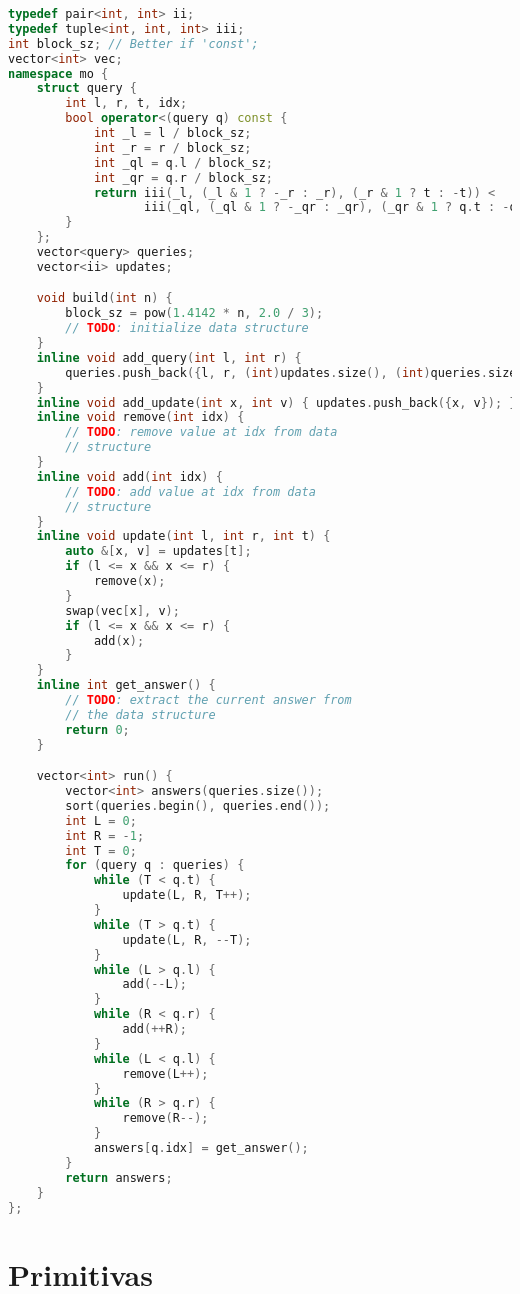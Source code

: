 \documentclass[10pt, a4paper, oneside]{book}
\begin{document}
\begin{lstlisting}[language=C++]
typedef pair<int, int> ii;
typedef tuple<int, int, int> iii;
int block_sz; // Better if 'const';
vector<int> vec;
namespace mo {
    struct query {
        int l, r, t, idx;
        bool operator<(query q) const {
            int _l = l / block_sz;
            int _r = r / block_sz;
            int _ql = q.l / block_sz;
            int _qr = q.r / block_sz;
            return iii(_l, (_l & 1 ? -_r : _r), (_r & 1 ? t : -t)) <
                   iii(_ql, (_ql & 1 ? -_qr : _qr), (_qr & 1 ? q.t : -q.t));
        }
    };
    vector<query> queries;
    vector<ii> updates;

    void build(int n) {
        block_sz = pow(1.4142 * n, 2.0 / 3);
        // TODO: initialize data structure
    }
    inline void add_query(int l, int r) {
        queries.push_back({l, r, (int)updates.size(), (int)queries.size()});
    }
    inline void add_update(int x, int v) { updates.push_back({x, v}); }
    inline void remove(int idx) {
        // TODO: remove value at idx from data
        // structure
    }
    inline void add(int idx) {
        // TODO: add value at idx from data
        // structure
    }
    inline void update(int l, int r, int t) {
        auto &[x, v] = updates[t];
        if (l <= x && x <= r) {
            remove(x);
        }
        swap(vec[x], v);
        if (l <= x && x <= r) {
            add(x);
        }
    }
    inline int get_answer() {
        // TODO: extract the current answer from
        // the data structure
        return 0;
    }

    vector<int> run() {
        vector<int> answers(queries.size());
        sort(queries.begin(), queries.end());
        int L = 0;
        int R = -1;
        int T = 0;
        for (query q : queries) {
            while (T < q.t) {
                update(L, R, T++);
            }
            while (T > q.t) {
                update(L, R, --T);
            }
            while (L > q.l) {
                add(--L);
            }
            while (R < q.r) {
                add(++R);
            }
            while (L < q.l) {
                remove(L++);
            }
            while (R > q.r) {
                remove(R--);
            }
            answers[q.idx] = get_answer();
        }
        return answers;
    }
};
\end{lstlisting}
\hfill

\newpage

%
%
%
%

\chapter{Primitivas}
\end{document}
